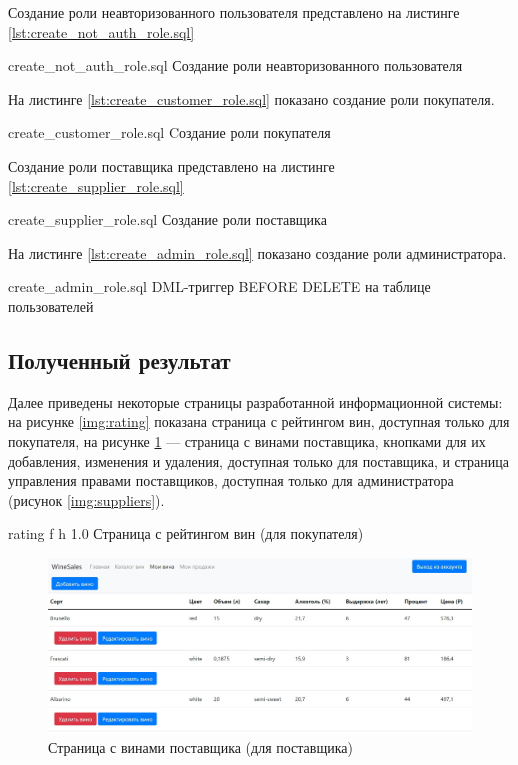 Создание роли неавторизованного пользователя представлено на листинге \ref{lst:create_not_auth_role.sql}

    {create_not_auth_role.sql}
    {Создание роли неавторизованного пользователя}
    
На листинге \ref{lst:create_customer_role.sql} показано создание роли покупателя.

    {create_customer_role.sql}
    {Cоздание роли покупателя}

Создание роли поставщика представлено на листинге \ref{lst:create_supplier_role.sql}

    {create_supplier_role.sql}
    {Создание роли поставщика}
    
На листинге \ref{lst:create_admin_role.sql} показано создание роли администратора.

    {create_admin_role.sql}
    {DML-триггер BEFORE DELETE на таблице пользователей}

\subsection{Полученный результат}

Далее приведены некоторые страницы разработанной информационной системы: на рисунке \ref{img:rating} показана страница с рейтингом вин, доступная только для покупателя, на рисунке \ref{img:supplierWines} --- страница с винами поставщика, кнопками для их добавления, изменения и удаления, доступная только для поставщика, и страница управления правами поставщиков, доступная только для администратора (рисунок \ref{img:suppliers}).
    
    {rating}
    {f}
    {h}
    {1.0\textwidth}
    {Страница с рейтингом вин (для покупателя)}

\begin{figure}[H]
	\begin{center}
		\includegraphics[scale=0.25]{inc/img/supplierWines.jpg}
	\end{center}
	\captionsetup{justification=centering}
	\caption{Страница с винами поставщика (для поставщика)}
	\label{img:supplierWines}
\end{figure}
    
